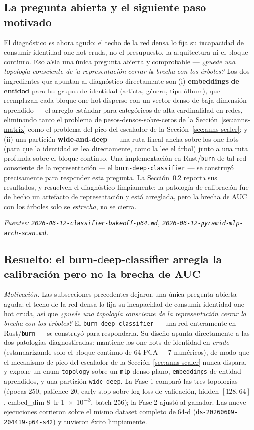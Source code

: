 \documentclass[11pt]{article}
\newcommand{\dsid}[1]{\texttt{\small #1}}
\begin{document}
\subsection{La pregunta abierta y el siguiente paso motivado}
\label{sec:anns-next}
El diagnóstico es ahora agudo: el techo de la red densa lo fija su incapacidad de
consumir identidad one-hot cruda, no el presupuesto, la arquitectura ni el bloque
continuo. Eso aísla una única pregunta abierta y comprobable --- \emph{¿puede una
topología consciente de la representación cerrar la brecha con los árboles?} Los
dos ingredientes que apuntan al diagnóstico directamente son (i)
\textbf{embeddings de entidad} para los grupos de identidad (artista, género,
tipo-álbum), que reemplazan cada bloque one-hot disperso con un vector denso de
baja dimensión aprendido --- el arreglo estándar para categóricos de alta
cardinalidad en redes, eliminando tanto el problema de pesos-densos-sobre-ceros de
la Sección~\ref{sec:anns-matrix} como el problema del pico del escalador de la
Sección~\ref{sec:anns-scaler}; y (ii) una partición \textbf{wide-and-deep} --- una
ruta lineal ancha sobre los one-hots (para que la identidad se lea directamente,
como la lee el árbol) junto a una ruta profunda sobre el bloque continuo. Una
implementación en Rust/\texttt{burn} de tal red consciente de la representación
--- el \texttt{burn-deep-classifier} --- se construyó precisamente para responder
esta pregunta. La Sección~\ref{sec:anns-burn} reporta sus resultados, y resuelven
el diagnóstico limpiamente: la patología de calibración fue de hecho un artefacto
de representación y está arreglada, pero la brecha de AUC con los árboles solo se
\emph{estrecha}, no se cierra.

\emph{Fuentes: \texttt{2026-06-12-classifier-bakeoff-p64.md},
\texttt{2026-06-12-pyramid-mlp-arch-scan.md}.}

\subsection{Resuelto: el burn-deep-classifier arregla la calibración pero no la brecha de AUC}
\label{sec:anns-burn}
\emph{Motivación.} Las subsecciones precedentes dejaron una única pregunta abierta
aguda: el techo de la red densa lo fija su incapacidad de consumir identidad
one-hot cruda, así que \emph{¿puede una topología consciente de la representación
cerrar la brecha con los árboles?} El \texttt{burn-deep-classifier} --- una red
enteramente en Rust/\texttt{burn} --- se construyó para responderla. Su diseño
apunta directamente a las dos patologías diagnosticadas: mantiene los one-hots de
identidad en \emph{crudo} (estandarizando solo el bloque continuo de 64 PCA $+$ 7
numéricos), de modo que el mecanismo de pico del escalador de la
Sección~\ref{sec:anns-scaler} nunca dispara, y expone un enum \texttt{topology}
sobre un \texttt{mlp} denso plano, \texttt{embeddings} de entidad aprendidos, y
una partición \texttt{wide\_deep}. La Fase 1 comparó las tres topologías (épocas
250, patience 20, early-stop sobre log-loss de validación, hidden $[128,64]$,
embed\_dim 8, lr \num{1e-3}, batch 256); la Fase 2 ajustó al ganador. Las nueve
ejecuciones corrieron sobre el mismo dataset completo de 64-d
(\dsid{ds-20260609-204419-p64-s42}) y tuvieron éxito limpiamente.
\end{document}

